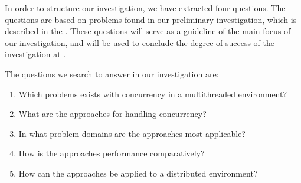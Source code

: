 \makeatletter {}\makeatother
{}
%
In order to structure our investigation, we have extracted four questions. The questions are based on problems found in our preliminary investigation, which is described in the . These questions will serve as a guideline of the main focus of our investigation, and will be used to conclude the degree of success of the investigation at .

The questions we search to answer in our investigation are:
\begin{enumerate}
\item Which problems exists with concurrency in a multithreaded environment? 
\item What are the approaches for handling concurrency?
\item In what problem domains are the approaches most applicable?
\item How is the approaches performance comparatively?
\item How can the approaches be applied to a distributed environment?
\end{enumerate}

\worksheetend